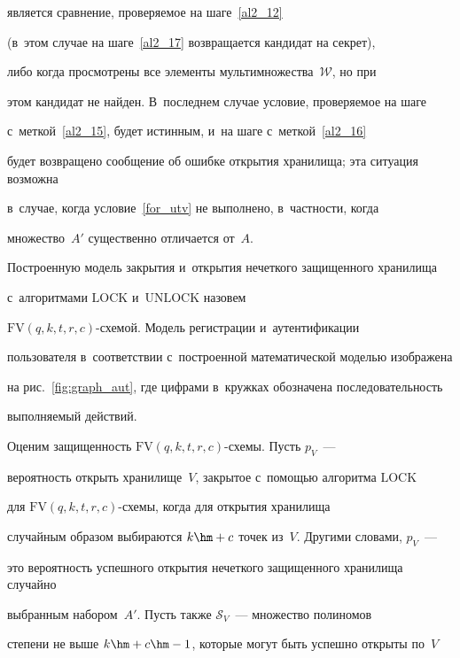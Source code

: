 является сравнение, проверяемое на шаге~\ref{al2_12} 


(в~этом случае на шаге~\ref{al2_17} возвращается кандидат на секрет), 


либо когда просмотрены все элементы мультимножества~$\mathcal{W}$, но при 


этом кандидат не найден. В~последнем случае условие, проверяемое на шаге 


с~меткой~\ref{al2_15}, будет истинным, и~на шаге с~меткой~\ref{al2_16} 


будет возвращено сообщение об ошибке открытия хранилища; эта ситуация возможна


 в~случае, когда условие~\eqref{for_utv} не выполнено, в~част\-ности, когда 


 множество~$A'$ существенно отличается от~$A$.











Построенную модель закрытия и~открытия нечеткого защищенного хранилища 


с~алгоритмами $\mathrm{LOCK}$ и~$\mathrm{UNLOCK}$ назовем  


$\mathrm{FV}(q,k,t,r,c)$-схе\-мой. Модель регистрации и~аутентификации 


пользователя в~соответствии с~построенной математической моделью изображена 


на рис.~\ref{fig:graph_aut}, где цифрами в~кружках обозначена последовательность 


выполняемый действий.





Оценим защищенность $\mathrm{FV}(q,k,t,r,c)$-схемы. Пусть $p_{V}$~--- 


вероятность открыть хранилище~$V$, закрытое с~по\-мощью алгоритма $\mathrm{LOCK}$ 


для $\mathrm{FV}(q,k,t,r,c)$-схе\-мы, когда для открытия хранилища 


случайным образом выбираются $k\hm+c$ точек из~$V$. Другими словами, $p_{V}$~--- 


это вероятность успешного открытия нечеткого защищенного хранилища случайно 


выбранным набором~$A'$. Пусть также $\mathcal{S}_{V}$~--- множество полиномов 


степени не выше $k\hm+c\hm-1$, которые могут быть успешно открыты по~$V$ 


